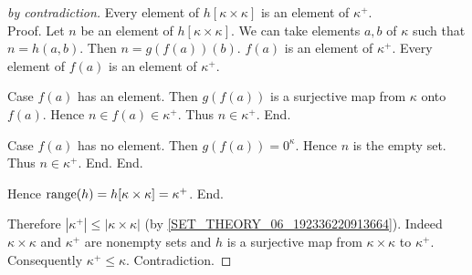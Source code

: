 \documentclass{article}
\begin{document}
\begin{forthel}
\begin{proof}[by contradiction]
        Every element of $h[\kappa \times \kappa]$ is an element of
        $\kappa^{+}$. \\
        Proof.
          Let $n$ be an element of $h[\kappa \times \kappa]$.
          We can take elements $a, b$ of $\kappa$ such that $n = h(a,b)$.
          Then $n = g(f(a))(b)$.
          $f(a)$ is an element of $\kappa^{+}$.
          Every element of $f(a)$ is an element of $\kappa^{+}$.

          Case $f(a)$ has an element.
            Then $g(f(a))$ is a surjective map from $\kappa$ onto $f(a)$.
            Hence $n \in f(a) \in \kappa^{+}$.
            Thus $n \in \kappa^{+}$.
          End.

          Case $f(a)$ has no element.
            Then $g(f(a)) = 0^{\kappa}$.
            Hence $n$ is the empty set.
            Thus $n \in \kappa^{+}$.
          End.
        End.

        Hence $\textrm{range}(h) = h[\kappa \times \kappa] = \kappa^{+}$.
      End.

      Therefore $|\kappa^{+}| \leq |\kappa \times \kappa|$
      (by \ref{SET_THEORY_06_192336220913664}).
      Indeed $\kappa \times \kappa$ and $\kappa^{+}$ are nonempty sets and $h$
      is a surjective map from $\kappa \times \kappa$ to $\kappa^{+}$.
      Consequently $\kappa^{+} \leq \kappa$.
      Contradiction.
    \end{proof}
  \end{forthel}

  \printbibliography
\end{document}
